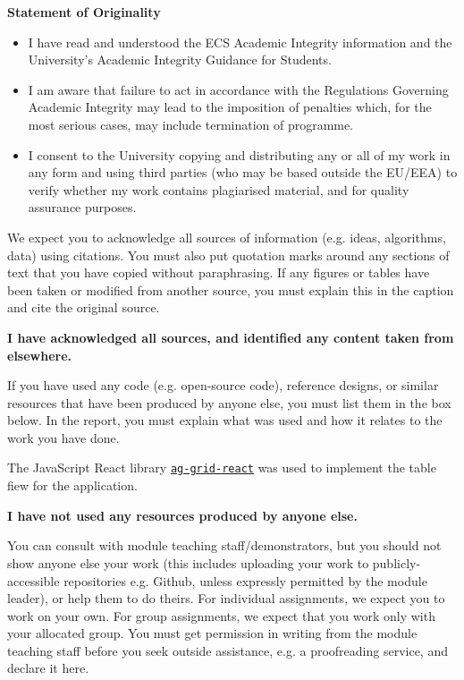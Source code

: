 \textbf{Statement of Originality}
\begin{itemize}
    \item I have read and understood the ECS Academic Integrity information and the University’s Academic Integrity Guidance for Students.
    \item I am aware that failure to act in accordance with the Regulations Governing Academic Integrity may lead to the imposition of penalties which, for the most serious cases, may include termination of programme.
    \item I consent to the University copying and distributing any or all of my work in any form and using third parties (who may be based outside the EU/EEA) to verify whether my work contains plagiarised material, and for quality assurance purposes.
\end{itemize}

We expect you to acknowledge all sources of information (e.g. ideas, algorithms, data) using citations. You must also put quotation marks around any sections of text that you have copied without paraphrasing. If any figures or tables have been taken or modified from another source, you must explain this in the caption and cite the original source.

\textbf{I have acknowledged all sources, and identified any content taken from elsewhere.}

If you have used any code (e.g. open-source code), reference designs, or similar resources that have been produced by anyone else, you must list them in the box below. In the report, you must explain what was used and how it relates to the work you have done.

The JavaScript React library \href{https://www.ag-grid.com/react-data-grid/getting-started/}{\texttt{ag-grid-react}} was used to implement the table fiew for the application.

\textbf{I have not used any resources produced by anyone else.}

You can consult with module teaching staff/demonstrators, but you should not show anyone else your work (this includes uploading your work to publicly-accessible repositories e.g. Github, unless expressly permitted by the module leader), or help them to do theirs. For individual assignments, we expect you to work on your own. For group assignments, we expect that you work only with your allocated group. You must get permission in writing from the module teaching staff before you seek outside assistance, e.g. a proofreading service, and declare it here.

